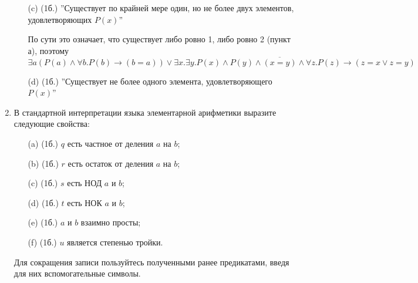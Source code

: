 \begin{enumerate}
\begin{itemize}
\begin{solution}
        \end{solution}
        \item[(c)] (1б.) ”Существует по крайней мере один, но не более двух элементов, удовлетворяющих $P(x)$”
        \begin{solution}
            По сути это означает, что существует либо ровно 1, либо ровно 2 (пункт а), поэтому
            \begin{equation}
                \exists a(P(a) \land \forall b. P(b) \rightarrow (b = a)) \lor \exists x. \exists y. P(x) \land P(y) \land \overline{(x=y)} \land \forall z. P(z) \rightarrow (z = x \lor z = y)
            \end{equation}
        \end{solution}
        \item[(d)] (1б.) ”Существует не более одного элемента, удовлетворяющего $P(x)$”
    \end{itemize}
    \item В стандартной интерпретации языка элементарной арифметики выразите следующие свойства:
    \begin{itemize}
        \item[(a)] (1б.) $q$ есть частное от деления $a$ на $b$;
        \item[(b)] (1б.) $r$ есть остаток от деления $a$ на $b$;
        \item[(c)] (1б.) $s$ есть НОД $a$ и $b$;
        \item[(d)] (1б.) $t$ есть НОК $a$ и $b$;
        \item[(e)] (1б.) $a$ и $b$ взаимно просты;
        \item[(f)] (1б.) $u$ является степенью тройки.
    \end{itemize}
    Для сокращения записи пользуйтесь полученными ранее предикатами, введя для них вспомогательные символы.
    
\end{enumerate}
\clearpage
